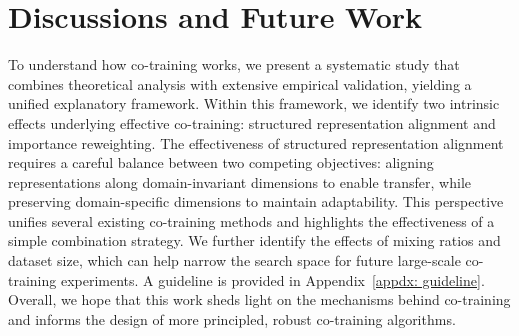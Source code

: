 \section{Discussions and Future Work}

To understand how co-training works, we present a systematic study that combines theoretical analysis with extensive empirical validation, yielding a unified explanatory framework.
Within this framework, we identify two intrinsic effects underlying effective co-training: structured representation alignment and importance reweighting.
The effectiveness of structured representation alignment requires a careful balance between two competing objectives: aligning representations along domain-invariant dimensions to enable transfer, while preserving domain-specific dimensions to maintain adaptability.
This perspective unifies several existing co-training methods and highlights the effectiveness of a simple combination strategy.
We further identify the effects of mixing ratios and dataset size, which can help narrow the search space for future large-scale co-training experiments.
A guideline is provided in Appendix~\ref{appdx: guideline}.
Overall, we hope that this work sheds light on the mechanisms behind co-training and informs the design of more principled, robust co-training algorithms.

